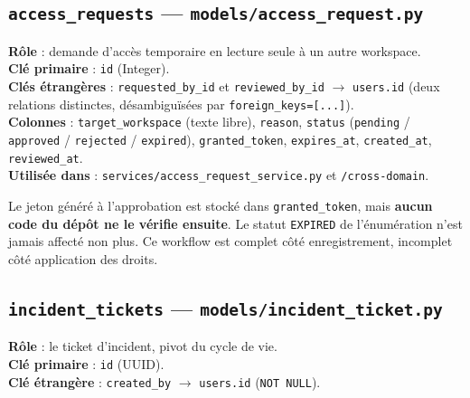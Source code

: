 \documentclass[11pt,a4paper]{report}
\newcommand{\file}[1]{\texttt{\small #1}}
\newcommand{\tbl}[1]{\texttt{\small\textcolor{oasisamber}{#1}}}
\newcommand{\route}[1]{\texttt{\small\textcolor{oasisgreen}{#1}}}
\newcommand{\arrowto}{\ensuremath{\rightarrow}}
\begin{document}
\subsection{\tbl{access\_requests} --- \file{models/access\_request.py}}

\textbf{Rôle} : demande d'accès temporaire en lecture seule à un autre
workspace.\\
\textbf{Clé primaire} : \texttt{id} (Integer).\\
\textbf{Clés étrangères} : \texttt{requested\_by\_id} et \texttt{reviewed\_by\_id}
\arrowto{} \texttt{users.id} (deux relations distinctes, désambiguïsées par
\texttt{foreign\_keys=[...]}).\\
\textbf{Colonnes} : \texttt{target\_workspace} (texte libre), \texttt{reason},
\texttt{status} (\texttt{pending} / \texttt{approved} / \texttt{rejected} /
\texttt{expired}), \texttt{granted\_token}, \texttt{expires\_at},
\texttt{created\_at}, \texttt{reviewed\_at}.\\
\textbf{Utilisée dans} : \file{services/access\_request\_service.py} et
\route{/cross-domain}.

\begin{warnbox}
Le jeton généré à l'approbation est stocké dans \texttt{granted\_token}, mais
\textbf{aucun code du dépôt ne le vérifie ensuite}. Le statut \texttt{EXPIRED} de
l'énumération n'est jamais affecté non plus. Ce workflow est complet côté
enregistrement, incomplet côté application des droits.
\end{warnbox}

\subsection{\tbl{incident\_tickets} --- \file{models/incident\_ticket.py}}

\textbf{Rôle} : le ticket d'incident, pivot du cycle de vie.\\
\textbf{Clé primaire} : \texttt{id} (UUID).\\
\textbf{Clé étrangère} : \texttt{created\_by} \arrowto{} \texttt{users.id}
(\texttt{NOT NULL}).
\end{document}
